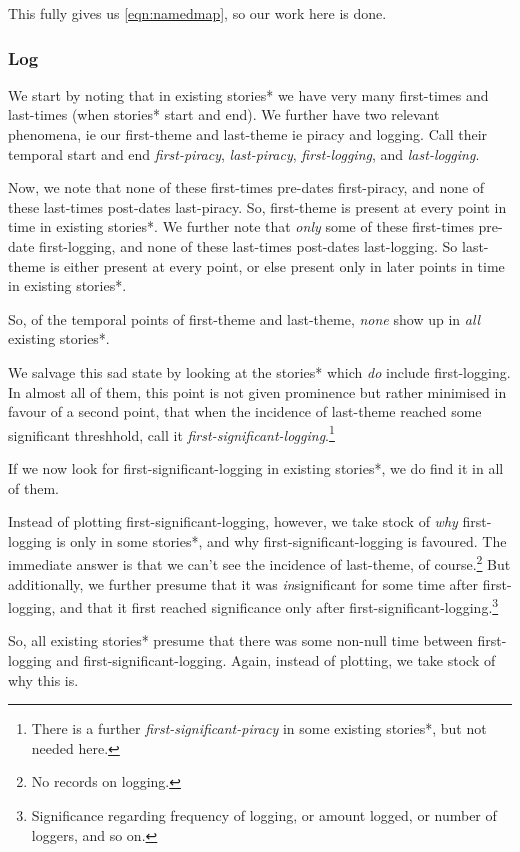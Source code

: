 \documentclass{amsart}
\newcommand{\ment}[1]{\textit{#1}} %
\theoremstyle{definition}
\theoremstyle{remark}
\begin{document}
			This fully gives us \ref{eqn:namedmap}, so our work here is done.
		\subsubsection{Log}
		\label{sss:log}
			We start by noting that in existing stories* we have very many first-times and last-times (when stories* start and end). We further have two relevant phenomena, ie our first-theme and last-theme ie piracy and logging. Call their temporal start and end \ment{first-piracy}, \ment{last-piracy}, \ment{first-logging}, and \ment{last-logging}.
			
			Now, we note that none of these first-times pre-dates first-piracy, and none of these last-times post-dates last-piracy. So, first-theme is present at every point in time in existing stories*. We further note that \emph{only} some of these first-times pre-date first-logging, and none of these last-times post-dates last-logging. So last-theme is either present at every point, or else present only in later points in time in existing stories*.
			
			So, of the temporal points of first-theme and last-theme, \emph{none} show up in \emph{all} existing stories*.
			
			We salvage this sad state by looking at the stories* which \emph{do} include first-logging. In almost all of them, this point is not given prominence but rather minimised in favour of a second point, that when the incidence of last-theme reached some significant threshhold, call it \ment{first-significant-logging}.\footnote{There is a further \ment{first-significant-piracy} in some existing stories*, but not needed here.}
			
			If we now look for first-significant-logging in existing stories*, we do find it in all of them.
			
			Instead of plotting first-significant-logging, however, we take stock of \emph{why} first-logging is only in some stories*, and why first-significant-logging is favoured. The immediate answer is that we can't see the incidence of last-theme, of course.\footnote{No records on logging.} But additionally, we further presume that it was \emph{in}significant for some time after first-logging, and that it first reached significance only after first-significant-logging.\footnote{Significance regarding frequency of logging, or amount logged, or number of loggers, and so on.}
			
			So, all existing stories* presume that there was some non-null time between first-logging and first-significant-logging. Again, instead of plotting, we take stock of why this is.
			
\end{document}
